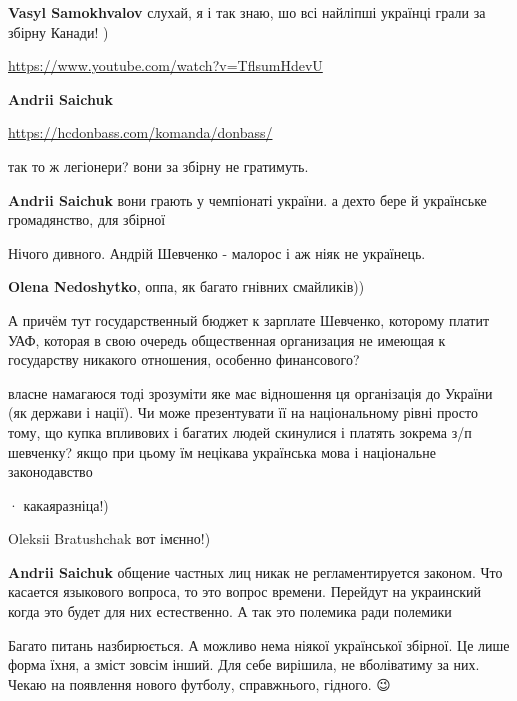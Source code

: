 \begin{itemize}
\begin{itemize}
\textbf{Vasyl Samokhvalov} слухай, я і так знаю, шо всі найліпші українці грали за збірну Канади! )\par
\url{https://www.youtube.com/watch?v=TflsumHdevU}

\textbf{Andrii Saichuk} 

\url{https://hcdonbass.com/komanda/donbass/}

так то ж легіонери? вони за збірну не гратимуть.

\textbf{Andrii Saichuk} вони грають у чемпіонаті україни. а дехто бере й
українське громадянство, для збірної

\end{itemize}

Нічого дивного. Андрій Шевченко - малорос і аж ніяк не українець.

\textbf{Olena Nedoshytko}, оппа, як багато гнівних смайликів))


А причём тут государственный бюджет к зарплате Шевченко, которому платит УАФ,
которая в свою очередь общественная организация не имеющая к государству
никакого отношения, особенно финансового?

\begin{itemize}

власне намагаюся тоді зрозуміти яке має відношення ця організація до України
(як держави і нації). Чи може презентувати її на національному рівні просто
тому, що купка впливових і багатих людей скинулися і платять зокрема з/п
шевченку? якщо при цьому їм нецікава українська мова і національне
законодавство 🤷

  · 
какаяразніца!)

Oleksii Bratushchak вот імєнно!)

\textbf{Andrii Saichuk} общение частных лиц никак не регламентируется законом. Что касается языкового вопроса, то это вопрос времени. Перейдут на украинский когда это будет для них естественно. А так это полемика ради полемики

Багато питань назбирюється.
А можливо нема ніякої української збірної. Це лише форма їхня, а зміст зовсім інший.
Для себе вирішила, не вболіватиму за них. Чекаю на появлення нового футболу, справжнього, гідного.
😉


\end{itemize}
\end{itemize}

